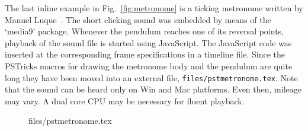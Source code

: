 \documentclass[a4paper]{article}
\begin{document}
The last inline example in Fig.~\ref{fig:metronome} is a ticking metronome written by Manuel Luque~\cite{luque12}. The short clicking sound was embedded by means of the `media9' package. Whenever the pendulum reaches one of its reversal points, playback of the sound file is started using JavaScript. The JavaScript code was inserted at the corresponding frame specifications in a timeline file. Since the PSTricks macros for drawing the metronome body and the pendulum are quite long they have been moved into an external file, \verb+files/pstmetronome.tex+. Note that the sound can be heard only on Win and Mac platforms. Even then, mileage may vary. A dual core CPU may be necessary for fluent playback.
\begin{figure}[hb]
\centering
\begin{VerbatimOut}{files/pstmetronome.tex}
\makeatletter
{}
\def\psmetronome{\pst@object{psmetronome}}
\def\psmetronome@i{%
\begingroup%
\use@par%
  \begin@SpecialObj%
  \pstVerb{%
 /deg2rad {180 div 3.14159 mul} def
 /rad2deg {180 mul 3.14159 div} def
 /gp 9.8 def %
 /radius \psk@oscmetronomer 1e-2 mul def %
 /OA \psk@oscmetronomed 1e-2 mul def %
 /xC \psk@oscmetronomex 1e-2 mul def %
}}
\end{VerbatimOut}
\end{figure}
\end{document}
